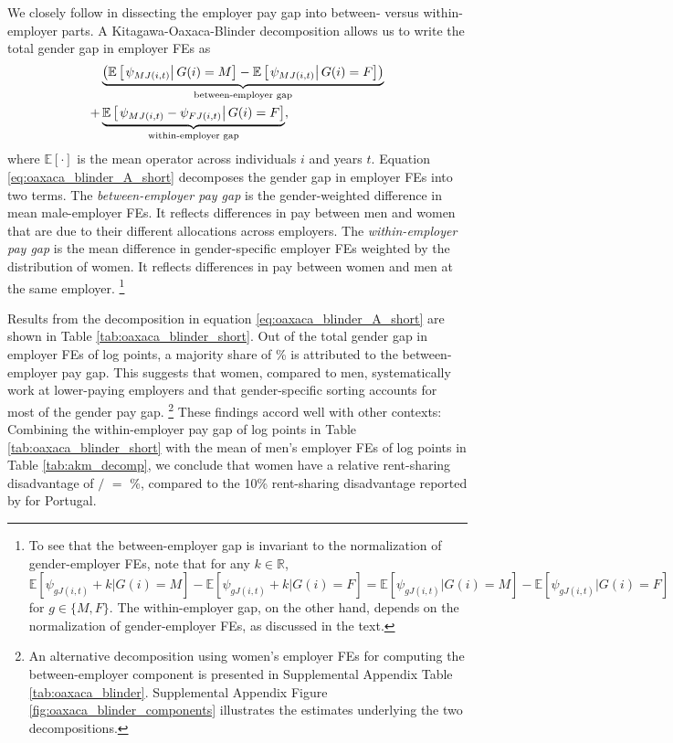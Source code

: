 We closely follow \citet{CardCardosoKline2016} in dissecting the employer pay gap into between- versus within-employer parts. A Kitagawa-Oaxaca-Blinder decomposition allows us to write the total gender gap in employer FEs as
%
\begin{align}
    &\underbrace{\left(\mathbb{E}\left[\left.\psi_{MJ(i,t)}\right| G(i) = M\right] - \mathbb{E}\left[\left.\psi_{MJ(i,t)}\right| G(i) = F\right]\right)}_{\text{between-employer gap}} \notag \\
    + &\underbrace{\mathbb{E}\left[\left.\psi_{MJ(i,t)} - \psi_{FJ(i,t)}\right| G(i) = F\right]}_{\text{within-employer gap}}, \label{eq:oaxaca_blinder_A_short}%
\end{align}
%
where $\mathbb{E}[\cdot]$ is the mean operator across individuals $i$ and years $t$. %
Equation \eqref{eq:oaxaca_blinder_A_short} decomposes the gender gap in employer FEs into two terms. %
%
The \emph{between-employer pay gap} is the gender-weighted difference in mean male-employer FEs. It reflects differences in pay between men and women that are due to their different allocations across employers. %
%
The \emph{within-employer pay gap} is the mean difference in gender-specific employer FEs weighted by the distribution of women. It reflects differences in pay between women and men at the same employer.%
%
\footnote{To see that the between-employer gap is invariant to the normalization of gender-employer FEs, note that for any $k \in \mathbb{R}$, $%
    \mathbb{E} [ \psi_{gJ(i,t)} + k | G(i) = M ] - \mathbb{E} [ \psi_{gJ(i,t)} + k | G(i) = F ] %
    = \mathbb{E} [ \psi_{gJ(i,t)} | G(i) = M ] - \mathbb{E} [ \psi_{gJ(i,t)} | G(i) = F ] %
$ for $g \in \{ M, F \}$. The within-employer gap, on the other hand, depends on the normalization of gender-employer FEs, as discussed in the text.} %
%

Results from the decomposition in equation \eqref{eq:oaxaca_blinder_A_short} are shown in Table \ref{tab:oaxaca_blinder_short}. Out of the total gender gap in employer FEs of  log points, a majority share of \% is attributed to the between-employer pay gap. This suggests that women, compared to men, systematically work at lower-paying employers and that gender-specific sorting accounts for most of the gender pay gap.%
%
\footnote{An alternative decomposition using women's employer FEs for computing the between-employer component is presented in Supplemental Appendix Table \ref{tab:oaxaca_blinder}. Supplemental Appendix Figure \ref{fig:oaxaca_blinder_components} illustrates the estimates underlying the two decompositions.} %
%
These findings accord well with other contexts: Combining the within-employer pay gap of  log points in Table \ref{tab:oaxaca_blinder_short} with the mean of men's employer FEs of  log points in Table \ref{tab:akm_decomp}, we conclude that women have a relative rent-sharing disadvantage of $/$ $=$ \%, compared to the 10\% rent-sharing disadvantage reported by \citet[][p.\ 618]{CardCardosoKline2016} for Portugal.

